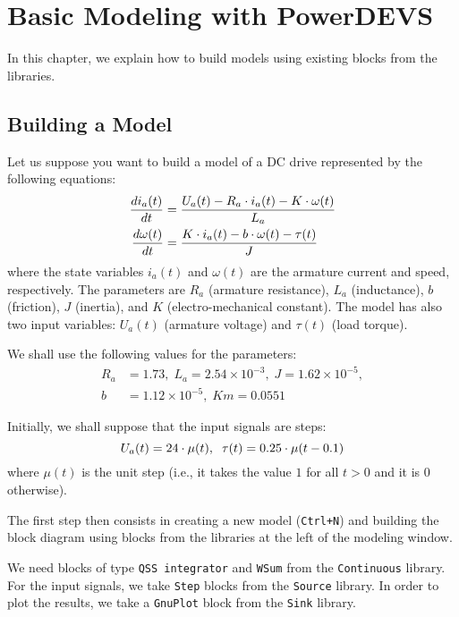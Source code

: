 \chapter{Basic Modeling with PowerDEVS}
In this chapter, we explain how to build models using existing blocks from the libraries.

\section{Building a Model}
Let us suppose you want to build a model of a DC drive represented by the following equations:
\begin{equation}\label{eq:motor}
  \begin{split}
   \frac{\displaystyle di_a(t)}{\displaystyle dt}&=\frac{U_a(t)-R_a\cdot i_a(t)-K\cdot \omega(t)}{L_a}\\
   \frac{\displaystyle d\omega(t)}{\displaystyle dt}&=\frac{K\cdot i_a(t)-b\cdot \omega(t)-\tau(t)}{J}\\
  \end{split}
\end{equation}
where the state variables $i_a(t)$ and $\omega(t)$ are the armature current and speed, respectively. The parameters are $R_a$ (armature resistance), $L_a$ (inductance), $b$ (friction), $J$ (inertia), and $K$ (electro-mechanical constant). The model has also two input variables: $U_a(t)$ (armature voltage) and $\tau(t)$ (load torque).

We shall use the following values for the parameters:
\begin{equation}\label{eq:motor_pars}
\begin{split}
 R_a&=1.73,\;L_a=2.54\times 10^{-3},\;J=1.62\times 10^{-5},\\
b&=1.12\times 10^{-5},\;Km=0.0551 
\end{split}
\end{equation}

Initially, we shall suppose that the input signals are steps:
\begin{equation}
 U_a(t)=24\cdot \mu(t),\;\;\tau(t)=0.25\cdot \mu(t-0.1)
\end{equation}
where $\mu(t)$ is the unit step (i.e., it takes the value $1$ for all $t>0$ and it is $0$ otherwise).

The first step then consists in creating a new model (\verb"Ctrl+N") and building the block diagram using blocks from the libraries at the left of the modeling window.

We need blocks of type \verb"QSS integrator" and \verb"WSum" from the \verb"Continuous" library. For the input signals, we take \verb"Step" blocks from the \verb"Source" library. In order to plot the results, we take a \verb"GnuPlot" block from the \verb"Sink" library.

